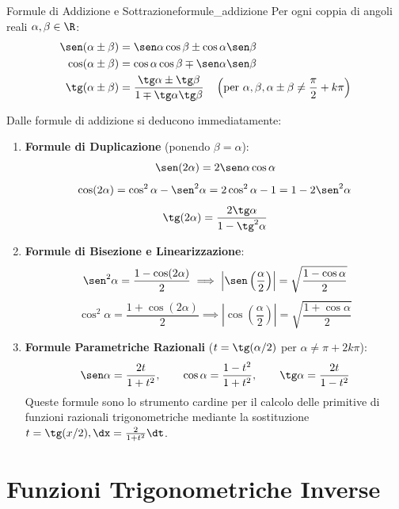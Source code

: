 \begin{teorema}{Formule di Addizione e Sottrazione}{formule_addizione}
Per ogni coppia di angoli reali $\alpha, \beta \in \R$:
\begin{align*}
    \sen(\alpha \pm \beta) &= \sen \alpha \cos \beta \pm \cos \alpha \sen \beta \\
    \cos(\alpha \pm \beta) &= \cos \alpha \cos \beta \mp \sen \alpha \sen \beta \\
    \tg(\alpha \pm \beta) &= \frac{\tg \alpha \pm \tg \beta}{1 \mp \tg \alpha \tg \beta} \quad \left(\text{per } \alpha, \beta, \alpha \pm \beta \neq \frac{\pi}{2} + k\pi\right)
\end{align*}
\end{teorema}

\begin{metodo}
Dalle formule di addizione si deducono immediatamente:
\begin{enumerate}
    \item \textbf{Formule di Duplicazione} (ponendo $\beta = \alpha$):
    \[
        \sen(2\alpha) = 2\sen\alpha\cos\alpha
    \]
    \[
        \cos(2\alpha) = \cos^2\alpha - \sen^2\alpha = 2\cos^2\alpha - 1 = 1 - 2\sen^2\alpha
    \]
    \[
        \tg(2\alpha) = \frac{2\tg\alpha}{1 - \tg^2\alpha}
    \]

    \item \textbf{Formule di Bisezione e Linearizzazione}:
    \[
        \sen^2\alpha = \frac{1 - \cos(2\alpha)}{2} \implies \left|\sen\left(\frac{\alpha}{2}\right)\right| = \sqrt{\frac{1 - \cos\alpha}{2}}
    \]
    \[
        \cos^2\alpha = \frac{1 + \cos(2\alpha)}{2} \implies \left|\cos\left(\frac{\alpha}{2}\right)\right| = \sqrt{\frac{1 + \cos\alpha}{2}}
    \]

    \item \textbf{Formule Parametriche Razionali} ($t = \tg(\alpha/2)$ per $\alpha \neq \pi + 2k\pi$):
    \[
        \sen\alpha = \frac{2t}{1 + t^2}, \qquad \cos\alpha = \frac{1 - t^2}{1 + t^2}, \qquad \tg\alpha = \frac{2t}{1 - t^2}
    \]
    Queste formule sono lo strumento cardine per il calcolo delle primitive di funzioni razionali trigonometriche mediante la sostituzione $t = \tg(x/2), \dx = \frac{2}{1+t^2}\dt$.
\end{enumerate}
\end{metodo}

\section{Funzioni Trigonometriche Inverse}
\label{sec:inverse_trigonometriche_dettaglio}

